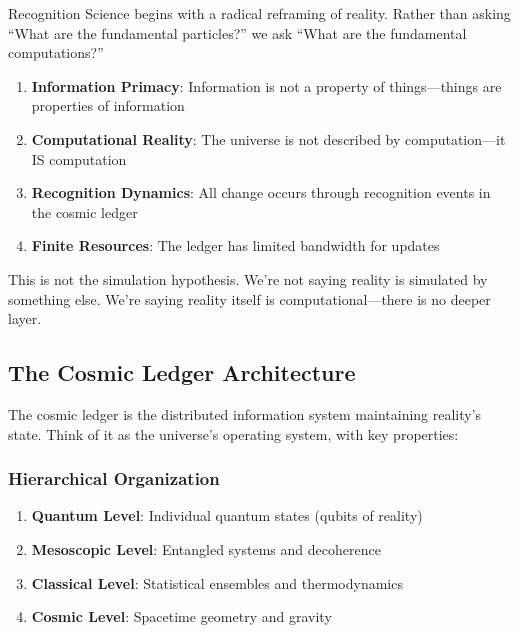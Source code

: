 \documentclass[12pt,letterpaper]{article}
\begin{document}
Recognition Science begins with a radical reframing of reality. Rather than asking ``What are the fundamental particles?'' we ask ``What are the fundamental computations?''

\begin{tcolorbox}[colback=blue!5, colframe=blue!50!black, title=The Recognition Science Axioms]
\begin{enumerate}
    \item \textbf{Information Primacy}: Information is not a property of things—things are properties of information
    \item \textbf{Computational Reality}: The universe is not described by computation—it IS computation
    \item \textbf{Recognition Dynamics}: All change occurs through recognition events in the cosmic ledger
    \item \textbf{Finite Resources}: The ledger has limited bandwidth for updates
\end{enumerate}
\end{tcolorbox}

This is not the simulation hypothesis. We're not saying reality is simulated by something else. We're saying reality itself is computational—there is no deeper layer.

\subsection{The Cosmic Ledger Architecture}

The cosmic ledger is the distributed information system maintaining reality's state. Think of it as the universe's operating system, with key properties:

\subsubsection{Hierarchical Organization}
\begin{enumerate}
    \item \textbf{Quantum Level}: Individual quantum states (qubits of reality)
    \item \textbf{Mesoscopic Level}: Entangled systems and decoherence
    \item \textbf{Classical Level}: Statistical ensembles and thermodynamics
    \item \textbf{Cosmic Level}: Spacetime geometry and gravity
\end{enumerate}
\end{document}
